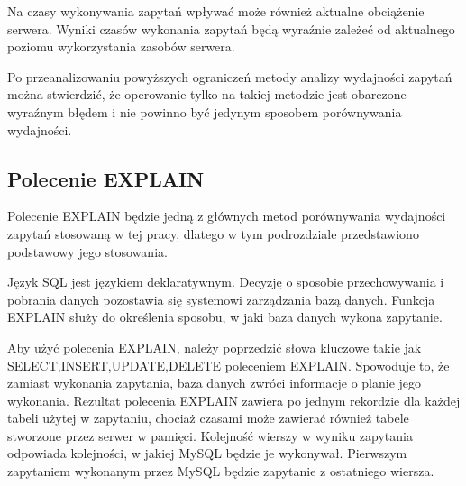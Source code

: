 Na czasy wykonywania zapytań wpływać może również aktualne obciążenie serwera. Wyniki czasów wykonania zapytań będą wyraźnie zależeć od aktualnego poziomu wykorzystania zasobów serwera.

Po przeanalizowaniu powyższych ograniczeń metody analizy wydajności zapytań można stwierdzić, że operowanie tylko na takiej metodzie jest obarczone wyraźnym błędem i nie powinno być jedynym sposobem porównywania wydajności.
\subsection{Polecenie EXPLAIN}
Polecenie EXPLAIN będzie jedną z głównych metod porównywania wydajności zapytań stosowaną w tej pracy, dlatego w tym podrozdziale przedstawiono podstawowy jego stosowania. 

Język SQL jest językiem deklaratywnym. Decyzję o sposobie przechowywania i pobrania danych pozostawia się systemowi zarządzania bazą danych. Funkcja EXPLAIN służy do określenia sposobu, w jaki baza danych wykona zapytanie.

Aby użyć polecenia EXPLAIN, należy poprzedzić słowa kluczowe takie jak SELECT,INSERT,UPDATE,DELETE poleceniem EXPLAIN. Spowoduje to, że zamiast wykonania zapytania, baza danych zwróci informacje o planie jego wykonania. Rezultat polecenia EXPLAIN zawiera po jednym rekordzie dla każdej tabeli użytej w zapytaniu, chociaż czasami może zawierać również tabele stworzone przez serwer w pamięci. Kolejność wierszy w wyniku zapytania odpowiada kolejności, w jakiej MySQL będzie je wykonywał. Pierwszym zapytaniem wykonanym przez MySQL będzie zapytanie z ostatniego wiersza.

